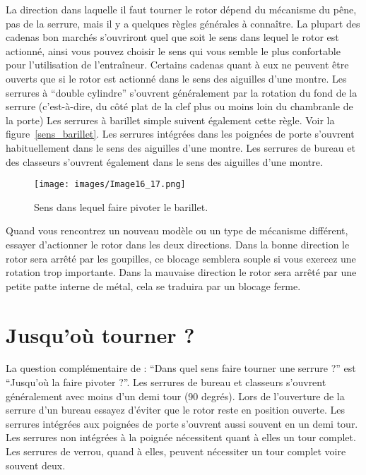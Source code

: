\documentclass[a4paper,french,11pt,twoside]{report}
\begin{document}
La direction dans laquelle il faut tourner le rotor dépend du mécanisme du pêne, pas de la serrure, mais il y a quelques règles générales à connaître. La plupart des cadenas bon marchés s'ouvriront quel que soit le sens dans lequel le rotor est actionné, ainsi vous pouvez choisir le sens qui vous semble le plus confortable pour l'utilisation de l'entraîneur. Certains cadenas quant à eux ne peuvent être ouverts que si le rotor est actionné dans le sens des aiguilles d'une montre. Les serrures à \enquote{double cylindre} s'ouvrent généralement par la rotation du fond de la serrure (c'est-à-dire, du côté plat de la clef plus ou moins loin du chambranle de la porte) Les serrures à barillet simple suivent également cette règle. Voir la figure~\vref{sens_barillet}. Les serrures intégrées dans les poignées de porte s'ouvrent habituellement dans le sens des aiguilles d'une montre. Les serrures de bureau et des classeurs s'ouvrent également dans le sens des aiguilles d'une montre.


\begin{figure}[ht]
  \begin{center}
    \texttt{[image: images/Image16\_17.png]}
    \caption{Sens dans lequel faire pivoter le barillet.\label{sens_barillet}}
  \end{center}
\end{figure}

Quand vous rencontrez un nouveau modèle ou un type de mécanisme différent, essayer d'actionner le rotor dans les deux directions. Dans la bonne direction le rotor sera arrêté par les goupilles, ce blocage semblera souple si vous exercez une rotation trop importante. Dans la mauvaise direction le rotor sera arrêté par une petite patte interne de métal, cela se traduira par un blocage ferme.

\section{Jusqu'où tourner ?}

La question complémentaire de : \enquote{Dans quel sens faire tourner une serrure ?} est \enquote{Jusqu'où la faire pivoter ?}. Les serrures de bureau et classeurs s'ouvrent généralement avec moins d'un demi tour (90 degrés). Lors de l'ouverture de la serrure d'un bureau essayez d'éviter que le rotor reste en position ouverte. Les serrures intégrées aux poignées de porte s'ouvrent aussi souvent en un demi tour. Les serrures non intégrées à la poignée nécessitent quant à elles un tour complet. Les serrures de verrou, quand à elles, peuvent nécessiter un tour complet voire souvent deux.
\end{document}
